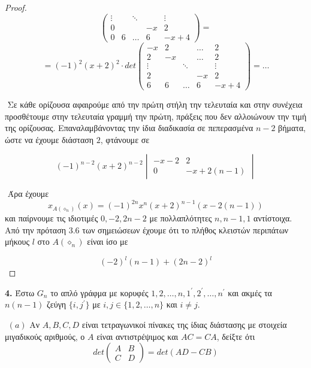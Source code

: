 \documentclass[oneside,a4paper]{article}
\begin{document}
\begin{proof}
$$\begin{pmatrix}
		\vdots & &  \ddots & &  \vdots \\
		 0  &  & & -x &2 \\
		 0 & 6 & \ldots & 6 & -x+4 
	\end{pmatrix} =$$
	$$= (-1)^2 (x+2)^2 \cdot det \begin{pmatrix}
		-x & 2 & & \ldots & 2 \\
		 2 & -x & & \ldots & 2 \\
		\vdots & &  \ddots & &  \vdots \\
		 2  &  & & -x &2 \\
		 6 & 6 & \ldots & 6 & -x+4 
	\end{pmatrix} = \ldots$$



	$ $\newline 
	Σε κάθε ορίζουσα αφαιρούμε από την πρώτη στήλη την τελευταία και στην συνέχεια προσθέτουμε στην τελευταία γραμμή την πρώτη, πράξεις που δεν αλλοιώνουν την τιμή της ορίζουσας. Επαναλαμβάνοντας την ίδια διαδικασία σε πεπερασμένα $n-2$ βήματα, ώστε να έχουμε διάσταση $2$, φτάνουμε σε

	$$(-1)^{n-2} (x+2)^{n-2} \begin{vmatrix}
		-x-2 & 2 \\
		0 & -x + 2(n-1)
	\end{vmatrix}$$

	$ $\newline
	Άρα έχουμε 
	$$x_{A(\diamond_n)} (x) = (-1)^{2n} x^n (x+2)^{n-1} (x- 2(n-1))$$
	και παίρνουμε τις ιδιοτιμές $0, -2, 2n-2$ με πολλαπλότητες $n,n-1,1$ αντίστοιχα. Από την πρόταση $3.6$ των σημειώσεων έχουμε ότι το πλήθος κλειστών περιπάτων μήκους $l$ στο $A(\diamond_n)$ είναι ίσο με 
	
	$$(-2)^l (n-1) + (2n-2)^l$$ 
\end{proof}

\pagebreak

\textbf{4.} Έστω $G_n$ το απλό γράφμα με κορυφές $1,2,\ldots,n,1^{\prime},2^{\prime},\ldots,n^{\prime}$ και ακμές τα $n(n-1)$ ζεύγη $\{i,j^{\prime}\}$ με $i,j \in \{1,2,\ldots,n\}$ και $i\neq j$.

$ $\newline
$(a)$ Αν $A,B,C,D$ είναι τετραγωνικοί πίνακες της ίδιας διάστασης με στοιχεία μιγαδικούς αριθμούς, ο $A$ είναι αντιστρέψιμος και $AC = CA$, δείξτε ότι
$$det \begin{pmatrix}
	A & B \\
	C & D
\end{pmatrix} = det(AD-CB)$$
\end{document}

